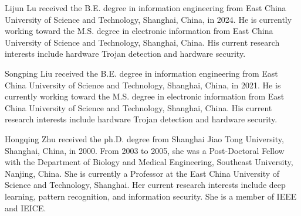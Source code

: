 \documentclass[10pt,journal, compsoc]{IEEEtran}
\begin{document}
\begin{IEEEbiography}{Lijun Lu}
received the B.E. degree in information engineering from East China University of Science and Technology, Shanghai, China, in 2024.
He is currently working toward the M.S. degree in electronic information from East China University of Science and Technology, Shanghai, China.
His current research interests include hardware Trojan detection and hardware security.
\end{IEEEbiography}

\begin{IEEEbiography}{Songping Liu}
received the B.E. degree in information engineering from East China University of Science and Technology, Shanghai, China, in 2021.
He is currently working toward the M.S. degree in electronic information from East China University of Science and Technology, Shanghai, China.
His current research interests include hardware Trojan detection and hardware security.
\end{IEEEbiography}


\begin{IEEEbiography}{Hongqing Zhu}
received the ph.D. degree from Shanghai Jiao Tong University, Shanghai, China, in 2000. From 2003 to 2005, she was a Post-Doctoral Fellow with the Department of Biology and Medical Engineering, Southeast University, Nanjing, China. She is currently a Professor at the East China University of Science and Technology, Shanghai. Her current research interests include deep learning, pattern recognition, and information security. She is a member of IEEE and IEICE.
\end{IEEEbiography}
\end{document}
